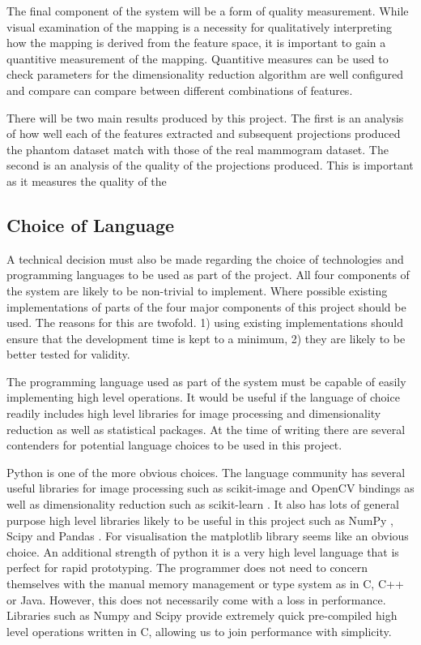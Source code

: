 The final component of the system will be a form of quality measurement. While visual examination of the mapping is a necessity for qualitatively interpreting how the mapping is derived from the feature space, it is important to gain a quantitive measurement of the mapping. Quantitive measures can be used to check parameters for the dimensionality reduction algorithm are well configured and compare can compare between different combinations of features. 

There will be two main results produced by this project. The first is an analysis of how well each of the features extracted and subsequent projections produced the phantom dataset match with those of the real mammogram dataset. The second is an analysis of the quality of the projections produced. This is important as it measures the quality of the 

\subsection{Choice of Language}
\label{sec:choice-of-language}
A technical decision must also be made regarding the choice of technologies and programming languages to be used as part of the project. All four components of the system are likely to be non-trivial to implement. Where possible existing implementations of parts of the four major components of this project should be used. The reasons for this are twofold. 1) using existing implementations should ensure that the development time is kept to a minimum, 2) they are likely to be better tested for validity. 

The programming language used as part of the system must be capable of easily implementing high level operations. It would be useful if the language of choice readily includes high level libraries for image processing and dimensionality reduction as well as statistical packages. At the time of writing there are several contenders for potential language choices to be used in this project. 

Python \cite{pythonLanguage} is one of the more obvious choices. The language community has several useful libraries for image processing such as scikit-image \cite{van2014scikit} and OpenCV bindings \cite{openCV} as well as dimensionality reduction such as scikit-learn \cite{pedregosa2011scikit}. It also has lots of general purpose high level libraries likely to be useful in this project such as NumPy \cite{pythonNumpy}, Scipy \cite{jones2014scipy} and Pandas \cite{pythonPandas}. For visualisation the matplotlib library seems like an obvious choice. An additional strength of python it is a very high level language that is perfect for rapid prototyping. The programmer does not need to concern themselves with the manual memory management or type system as in C, C++ or Java. However, this does not necessarily come with a loss in performance. Libraries such as Numpy and Scipy provide extremely quick pre-compiled high level operations written in C, allowing us to join performance with simplicity.

